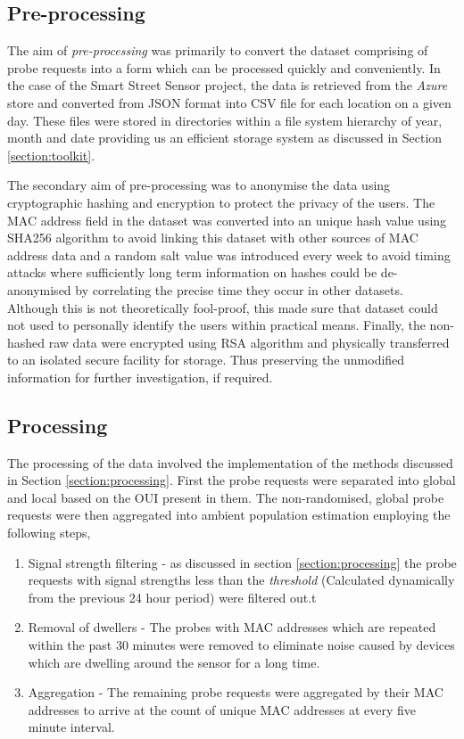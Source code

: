 \subsection{Pre-processing}
The aim of \textit{pre-processing} was primarily to convert the dataset comprising of probe requests into a form which can be processed quickly and conveniently.
In the case of the Smart Street Sensor project, the data is retrieved from the \textit{Azure} store and converted from JSON format into CSV file for each location on a given day.
These files were stored in directories within a file system hierarchy of year, month and date providing us an efficient storage system as discussed in Section \ref{section:toolkit}.

The secondary aim of pre-processing was to anonymise the data using cryptographic hashing and encryption to protect the privacy of the users.
The MAC address field in the dataset was converted into an unique hash value using SHA256 algorithm to avoid linking this dataset with other sources of MAC address data and a random salt value was introduced every week to avoid timing attacks where sufficiently long term information on hashes could be de-anonymised by correlating the precise time they occur in other datasets.
Although this is not theoretically fool-proof, this made sure that dataset could not used to personally identify the users within practical means.
Finally, the non-hashed raw data were encrypted using RSA algorithm and physically transferred to an isolated secure facility for storage.
Thus preserving the unmodified information for further investigation, if required.

\subsection{Processing}
The processing of the data involved the implementation of the methods discussed in Section \ref{section:processing}.
First the probe requests were separated into global and local based on the OUI present in them. 
The non-randomised, global probe requests were then aggregated into ambient population estimation employing the following steps,

\begin{enumerate}
  \item Signal strength filtering - as discussed in section \ref{section:processing} the probe requests with signal strengths less than the \textit{threshold} (Calculated dynamically from the previous 24 hour period) were filtered out.t
  \item Removal of dwellers - The probes with MAC addresses which are repeated within the past 30 minutes were removed to eliminate noise caused by devices which are dwelling around the sensor for a long time.
  \item Aggregation - The remaining probe requests were aggregated by their MAC addresses to arrive at the count of unique MAC addresses at every five minute interval.
\end{enumerate}

